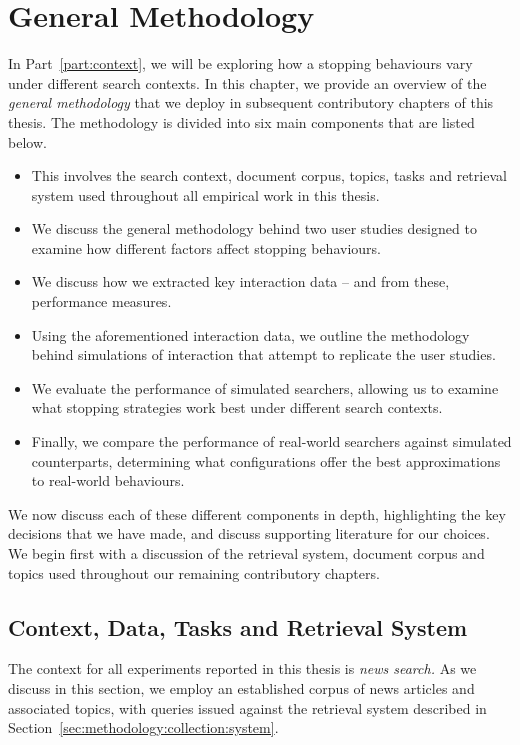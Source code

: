 
\chapter[General Methodology]{General Methodology}\label{chap:method}
In Part~\ref{part:context}, we will be exploring how a stopping behaviours vary under different search contexts. In this chapter, we provide an overview of the \emph{general methodology} that we deploy in subsequent contributory chapters of this thesis. The methodology is divided into six main components that are listed below.

\begin{itemize}
    \item{ This involves the search context, document corpus, topics, tasks and retrieval system used throughout all empirical work in this thesis.}
    \item{ We discuss the general methodology behind two user studies designed to examine how different factors affect stopping behaviours.}
    \item{ We discuss how we extracted key interaction data -- and from these, performance measures.}
    \item{ Using the aforementioned interaction data, we outline the methodology behind simulations of interaction that attempt to replicate the user studies.}
    \item{ We evaluate the performance of simulated searchers, allowing us to examine what stopping strategies work best under different search contexts.}
    \item{ Finally, we compare the performance of real-world searchers against simulated counterparts, determining what configurations offer the best approximations to real-world behaviours.}
\end{itemize}

We now discuss each of these different components in depth, highlighting the key decisions that we have made, and discuss supporting literature for our choices. We begin first with a discussion of the retrieval system, document corpus and topics used throughout our remaining contributory chapters.

\section{Context, Data, Tasks and Retrieval System}\label{sec:methodology:collection}
The context for all experiments reported in this thesis is \emph{news search.} As we discuss in this section, we employ an established corpus of news articles and associated topics, with queries issued against the retrieval system described in Section~\ref{sec:methodology:collection:system}.

